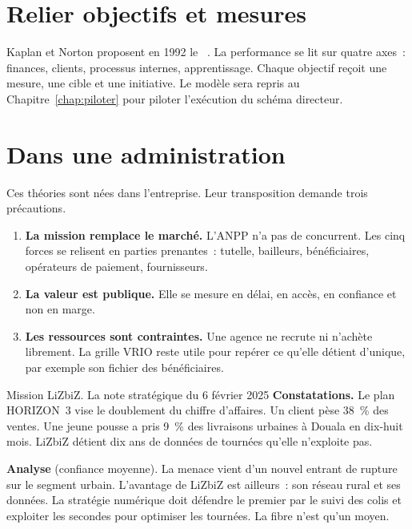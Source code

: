 \section{Relier objectifs et mesures}
\label{sec:c02-bsc}

Kaplan et Norton proposent en 1992 le ~\cite{kaplannorton1992}. La
performance se lit sur quatre axes~: finances, clients, processus internes, apprentissage. Chaque objectif reçoit
une mesure, une cible et une initiative. Le modèle sera repris au Chapitre~\ref{chap:piloter} pour piloter
l'exécution du schéma directeur.

\section{Dans une administration}
\label{sec:c02-public}

Ces théories sont nées dans l'entreprise. Leur transposition demande trois précautions.

\begin{enumerate}
    \item \textbf{La mission remplace le marché.} L'ANPP n'a pas de concurrent. Les cinq forces se relisent en
          parties prenantes~: tutelle, bailleurs, bénéficiaires, opérateurs de paiement, fournisseurs.
    \item \textbf{La valeur est publique.} Elle se mesure en délai, en accès, en confiance et non en marge.
    \item \textbf{Les ressources sont contraintes.} Une agence ne recrute ni n'achète librement. La grille VRIO
          reste utile pour repérer ce qu'elle détient d'unique, par exemple son fichier des bénéficiaires.
\end{enumerate}

\begin{boxscenario}{Mission LiZbiZ. La note stratégique du 6 février 2025}
\textbf{Constatations.} Le plan HORIZON~3 vise le doublement du chiffre d'affaires. Un client pèse 38~\% des
ventes. Une jeune pousse a pris 9~\% des livraisons urbaines à Douala en dix-huit mois. LiZbiZ détient dix ans
de données de tournées qu'elle n'exploite pas.

\textbf{Analyse} (confiance moyenne). La menace vient d'un nouvel entrant de rupture sur le segment urbain.
L'avantage de LiZbiZ est ailleurs~: son réseau rural et ses données. La stratégie numérique doit défendre le
premier par le suivi des colis et exploiter les secondes pour optimiser les tournées. La fibre n'est qu'un
moyen.
\end{boxscenario}

